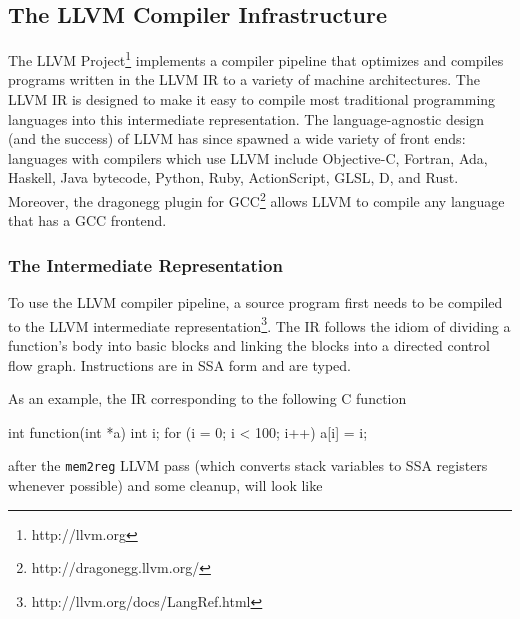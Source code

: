\subsection{The LLVM Compiler Infrastructure}

The LLVM Project\footnote{http://llvm.org} implements a compiler
pipeline that optimizes and compiles programs written in the LLVM IR
to a variety of machine architectures.  The LLVM IR is designed to
make it easy to compile most traditional programming languages into
this intermediate representation.  The language-agnostic design (and
the success) of LLVM has since spawned a wide variety of front ends:
languages with compilers which use LLVM include Objective-C, Fortran,
Ada, Haskell, Java bytecode, Python, Ruby, ActionScript, GLSL, D, and
Rust.  Moreover, the dragonegg plugin for
GCC\footnote{http://dragonegg.llvm.org/} allows LLVM to compile any
language that has a GCC frontend.

\subsubsection{The Intermediate Representation}

To use the LLVM compiler pipeline, a source program first needs to be
compiled to the LLVM intermediate
representation\footnote{http://llvm.org/docs/LangRef.html}.  The IR
follows the idiom of dividing a function's body into basic blocks and
linking the blocks into a directed control flow graph.  Instructions
are in SSA form and are typed.

As an example, the IR corresponding to the following C function

\begin{ccode}
int function(int *a) {
  int i;
  for (i = 0; i < 100; i++) {
    a[i] = i;
  }
}
\end{ccode}

after the \texttt{mem2reg} LLVM pass (which converts stack variables
to SSA registers whenever possible) and some cleanup, will look like


